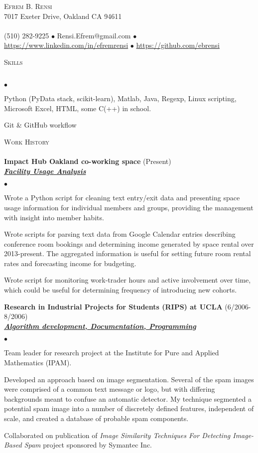 \documentclass{article}
\newcommand{\lineunder}{\vspace*{-8pt} \\ \hspace*{-18pt} \hrulefill \\}
\newcommand{\header}[1]{{\hspace*{-15pt}\vspace*{6pt} \textsc{#1}} \vspace*{-6pt} \lineunder}
\newcommand{\employer}[3]{{ \textbf{#1} (#2)\\ \underline{\textbf{\emph{#3}}}\\  }}
\newcommand{\contact}[3]{
\vspace*{-8pt}
\begin{center}
{\LARGE \scshape {#1}}\\
#2 \lineunder 
#3
\end{center}
\vspace*{-8pt}
}
\newenvironment{achievements}{\begin{list}{$\bullet$}{\topsep 0pt \itemsep -2pt}}{\vspace*{4pt}\end{list}}
\begin{document}
\small
\smallskip
\vspace*{-44pt}

\contact{Efrem B. Rensi}
{7017 Exeter Drive, Oakland CA 94611}
{(510) 282-9225 $\bullet$ Rensi.Efrem@gmail.com  $\bullet$ \url{https://www.linkedin.com/in/efremrensi} 
$\bullet$ \url{https://github.com/ebrensi}
}
\bigskip

\medskip
\header{Skills}
\begin{achievements}
\item Python (PyData stack, scikit-learn), Matlab, Java, Regexp, Linux scripting, Microsoft Excel, HTML, some  C(++) in school.
\item Git \& GitHub workflow
\end{achievements}
\medskip

\header{Work History}
\employer{Impact Hub Oakland co-working space}{Present}{Facility Usage Analysis}
\begin{achievements}
	\item Wrote a Python script for cleaning text entry/exit data and presenting space usage information for individual members and groups, providing the management with insight into member habits. 
 \item Wrote scripts for parsing text data from Google Calendar entries describing conference room bookings and determining income generated by space rental over 2013-present.  The aggregated information is useful for setting future room rental rates and forecasting income for budgeting.
\item Wrote script for monitoring work-trader hours and active involvement over time, which could be useful for determining frequency of introducing new cohorts.
\end{achievements}

\employer{Research in Industrial Projects for Students (RIPS) at UCLA}{6/2006-8/2006}{Algorithm development, Documentation, Programming}
	\begin{achievements}
	\item Team leader for research project at the Institute for Pure and Applied Mathematics (IPAM). 
	\item Developed an approach based on image segmentation. Several of the spam images were comprised of a common text message or logo, but with differing backgrounds meant to confuse an automatic detector. My technique segmented a potential spam image into a number of discretely defined features, independent of scale, and created a database of probable spam components.
	\item Collaborated on publication of \emph{Image Similarity Techniques For Detecting Image-Based Spam} project sponsored by Symantec Inc.

	\end{achievements}
\end{document}
